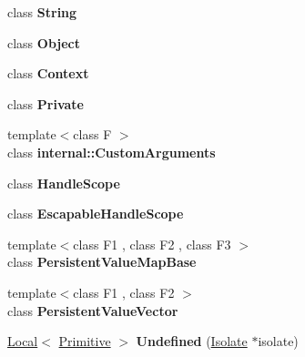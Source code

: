 \begin{DoxyCompactItemize}
\item 
\hypertarget{classv8_1_1_local_a7fb804f7dc96dd9f705c84095f37f1ca}{}class {\bfseries String}\label{classv8_1_1_local_a7fb804f7dc96dd9f705c84095f37f1ca}

\item 
\hypertarget{classv8_1_1_local_a0720b5f434e636e22a3ed34f847eec57}{}class {\bfseries Object}\label{classv8_1_1_local_a0720b5f434e636e22a3ed34f847eec57}

\item 
\hypertarget{classv8_1_1_local_ac26c806e60ca4a0547680edb68f6e39b}{}class {\bfseries Context}\label{classv8_1_1_local_ac26c806e60ca4a0547680edb68f6e39b}

\item 
\hypertarget{classv8_1_1_local_ac96b60d37bd806132da680e187dc2288}{}class {\bfseries Private}\label{classv8_1_1_local_ac96b60d37bd806132da680e187dc2288}

\item 
\hypertarget{classv8_1_1_local_a07108678a2af25caab612879ed7dca62}{}{\footnotesize template$<$class F $>$ }\\class {\bfseries internal\+::\+Custom\+Arguments}\label{classv8_1_1_local_a07108678a2af25caab612879ed7dca62}

\item 
\hypertarget{classv8_1_1_local_a5f127e488db492b05c8542cec0b880b7}{}class {\bfseries Handle\+Scope}\label{classv8_1_1_local_a5f127e488db492b05c8542cec0b880b7}

\item 
\hypertarget{classv8_1_1_local_ade20a528f8ee42d426959f061cff29ff}{}class {\bfseries Escapable\+Handle\+Scope}\label{classv8_1_1_local_ade20a528f8ee42d426959f061cff29ff}

\item 
\hypertarget{classv8_1_1_local_a08e2b8f164392d71811ce6cc134f33e3}{}{\footnotesize template$<$class F1 , class F2 , class F3 $>$ }\\class {\bfseries Persistent\+Value\+Map\+Base}\label{classv8_1_1_local_a08e2b8f164392d71811ce6cc134f33e3}

\item 
\hypertarget{classv8_1_1_local_a978bb1377559897d74d5fe883a54a315}{}{\footnotesize template$<$class F1 , class F2 $>$ }\\class {\bfseries Persistent\+Value\+Vector}\label{classv8_1_1_local_a978bb1377559897d74d5fe883a54a315}

\item 
\hypertarget{classv8_1_1_local_a696a04c5f02bf0aeedd1e5a539587de4}{}\hyperlink{classv8_1_1_local}{Local}$<$ \hyperlink{classv8_1_1_primitive}{Primitive} $>$ {\bfseries Undefined} (\hyperlink{classv8_1_1_isolate}{Isolate} $\ast$isolate)\label{classv8_1_1_local_a696a04c5f02bf0aeedd1e5a539587de4}


\end{DoxyCompactItemize}
